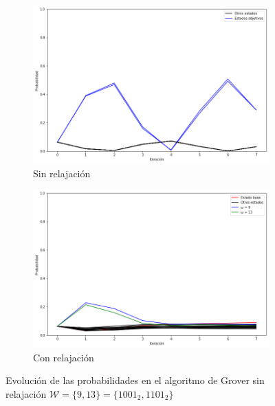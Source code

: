 \begin{figure}[H]
    \centering
    \begin{subfigure}[m]{0.49\textwidth}
        \centering
        \includegraphics[width=0.99\linewidth]{img/grover2lossless.png}
        \caption{Sin relajación}
    \end{subfigure}
    \begin{subfigure}[m]{0.49\textwidth}
        \centering
        \includegraphics[width=0.99\linewidth]{img/grover2loss.png}
        \caption{Con relajación}
    \end{subfigure}
    \caption[Evolución de las probabilidades en el algoritmo de Grover sin relajación, $\mathcal{W} = \{9, 13\}$]{Evolución de las probabilidades en el algoritmo de Grover sin relajación $\mathcal{W} = \{9, 13\} = \{1001_2, 1101_2\}$}
    \label{fig:groverlosscomp2}
\end{figure}


